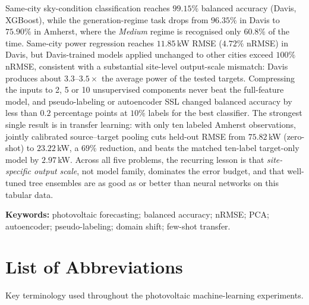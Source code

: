 \documentclass[11pt,letterpaper]{article}
\begin{document}
Same-city sky-condition classification reaches $99.15\%$ balanced accuracy (Davis, XGBoost),
while the generation-regime task drops from $96.35\%$ in Davis to $75.90\%$ in Amherst, where the
\emph{Medium} regime is recognised only $60.8\%$ of the time. Same-city power regression reaches
$11.85$\,kW RMSE ($4.72\%$ nRMSE) in Davis, but Davis-trained models applied unchanged to other
cities exceed $100\%$ nRMSE, consistent with a substantial site-level output-scale
mismatch: Davis produces about $3.3$--$3.5\times$ the average power of the tested targets. Compressing the inputs to 2, 5 or 10 unsupervised components never beat the
full-feature model, and pseudo-labeling or autoencoder SSL changed balanced accuracy by less than
$0.2$ percentage points at $10\%$ labels for the best classifier. The strongest single result is in
transfer learning: with only ten labeled Amherst observations, jointly calibrated source--target
pooling cuts held-out RMSE from $75.82$\,kW (zero-shot) to $23.22$\,kW, a $69\%$ reduction, and
beats the matched ten-label target-only model by $2.97$\,kW. Across all five problems, the
recurring lesson is that \emph{site-specific output scale}, not model family, dominates the error
budget, and that well-tuned tree ensembles are as good as or better than neural networks on
this tabular data.

\smallskip
\noindent\textbf{Keywords:} photovoltaic forecasting; balanced accuracy; nRMSE; PCA; autoencoder;
pseudo-labeling; domain shift; few-shot transfer.

\clearpage
\tableofcontents
\clearpage

\section*{List of Abbreviations}
\noindent\textcolor{reportgrey}{Key terminology used throughout the photovoltaic machine-learning experiments.}
\vspace{0.8em}
\end{document}
